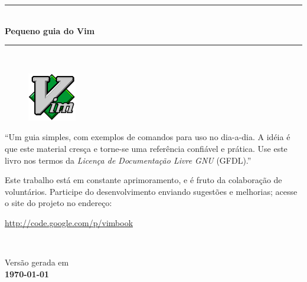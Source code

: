 \documentclass[10pt,a4paper,openany]{book}
\newcommand{\titulo}{\Huge \sc Pequeno guia do Vim}
\begin{document}

\begin{titlepage}
 \begin{flushleft}
   \vspace{2mm}
   \vspace{2mm}
   \vspace{2mm}
 \end{flushleft}
\begin{center}
   \rule{12cm}{1mm} \\ \vspace{2mm}
   {\LARGE{\bf{\titulo}}} \\
   \vspace{-1mm}
   \rule{12cm}{1mm} \\

  \vspace{2cm}
  \begin{figure}[h]
    \center
    \includegraphics{img/vimlogo.png}
    \label{logodovim}
\end{figure}

   \vspace{3cm}
   \begin{flushright}
   \begin{minipage}[t]{8cm}
          ``Um guia simples, com exemplos de comandos
          para uso no dia-a-dia. A idéia é que este
          material cresça e torne-se uma referência confiável
          e prática. Use este livro nos termos da {\em Licença de Documentação Livre GNU} (GFDL).'' \\
          \par Este trabalho está em constante aprimoramento, e é fruto da
          colaboração de voluntários. Participe do desenvolvimento enviando sugestões e
          melhorias; acesse o site do projeto no endereço: \\
\begin{center}
          \url{http://code.google.com/p/vimbook}
\end{center}
        
   \end{minipage} \\
   \end{flushright}

   \vspace{3cm}

   {\small Versão gerada em \\ \bf \today}
\end{center}
\end{titlepage}
\end{document}
